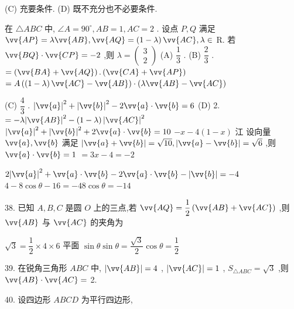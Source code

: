 (C) 充要条件. (D) 既不充分也不必要条件.

在 $\bigtriangleup {ABC}$ 中, $\angle A = {90}^{ \circ  },{AB} = 1,{AC} = 2$ . 设点 $P,Q$ 满足 $\vv{AP} = \lambda \vv{AB},\vv{AQ} = \left( {1 - \lambda }\right) \vv{AC},\lambda  \in$ R. 若 $\vv{BQ} \cdot  \vv{CP} =  - 2$ ,则 $\lambda  = \left( \begin{matrix} 3 \\  2 \end{matrix}\right)$ (A) $\dfrac{1}{3}$ . (B) $\dfrac{2}{3}$ . $= \left( {\vv{BA} + \vv{AQ}}\right) .\left( {\vv{CA} + \vv{AP}}\right)$  $= A\left( {\left( {1 - \lambda }\right) \vv{AC} - \vv{AB}}\right)  \cdot  \left( {\lambda \vv{AB} - \vv{AC}}\right)$

(C) $\dfrac{4}{3}$ . ${\left| \vv{a}\right| }^{2} + {\left| \vv{b}\right| }^{2} - 2\vv{a} \cdot  \vv{b} = 6$ (D) 2. $=  - \lambda {\left| \vv{AB}\right| }^{2} - \left( {1 - \lambda }\right) {\left| \vv{AC}\right| }^{2}$  ${\left| \vv{a}\right| }^{2} + {\left| \vv{b}\right| }^{2} + 2\vv{a} \cdot  \vv{b} = {10}$  $- x - 4\left( {1 - x}\right)$ 江 设向量 $\vv{a},\vv{b}$ 满足 $\left| {\vv{a} + \vv{b}}\right|  = \sqrt{10},\left| {\vv{a} - \vv{b}}\right|  = \sqrt{6}$ ,则 $\vv{a} \cdot  \vv{b} = 1$  $= {3x} - 4 =  - 2$

$2{\left| \vv{a}\right| }^{2} + \vv{a} \cdot  \vv{b} - 2\vv{a} \cdot  \vv{b} - \left| \vv{b}\right|  =  - 4$  $4 - 8\cos \theta  - {16} =  - 48\cos \theta  =  - {14}$

38. 已知 $A,B,C$ 是圆 $O$ 上的三点,若 $\vv{AQ} = \dfrac{1}{2}\left( {\vv{AB} + \vv{AC}}\right)$ ,则 $\vv{AB}$ 与 $\vv{AC}$ 的夹角为\blkda{}

$\sqrt{3} = \dfrac{1}{2} \times  4 \times  6$ 平面 $\sin \theta \sin \theta  = \dfrac{\sqrt{3}}{2}\cos \theta  = \dfrac{1}{2}$

39. 在锐角三角形 ${ABC}$ 中, $\left| \vv{AB}\right|  = 4$ , $\left| \vv{AC}\right|  = 1$ , ${S}_{\bigtriangleup {ABC}} = \sqrt{3}$ ,则 $\vv{AB} \cdot  \vv{AC} =$ \blkda{}2\blkda{}.

40. 设四边形 ${ABCD}$ 为平行四边形,

